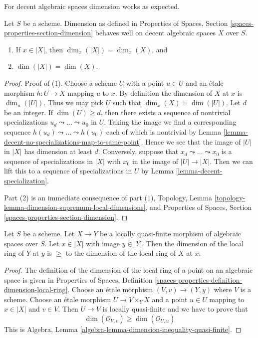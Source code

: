 \noindent
For decent algebraic spaces dimension works as expected.

\begin{lemma}
\label{lemma-dimension-decent-space}
Let $S$ be a scheme. Dimension as defined in
Properties of Spaces, Section \ref{spaces-properties-section-dimension}
behaves well on decent algebraic spaces $X$ over $S$.
\begin{enumerate}
\item If $x \in |X|$, then $\dim_x(|X|) = \dim_x(X)$, and
\item $\dim(|X|) = \dim(X)$.
\end{enumerate}
\end{lemma}

\begin{proof}
Proof of (1). Choose a scheme $U$ with a point $u \in U$
and an \'etale morphism $h : U \to X$ mapping $u$ to $x$.
By definition the dimension of $X$ at $x$ is $\dim_u(|U|)$.
Thus we may pick $U$ such that $\dim_x(X) = \dim(|U|)$.
Let $d$ be an integer. If $\dim(U) \geq d$, then
there exists a sequence of nontrivial specializations
$u_d \leadsto \ldots \leadsto u_0$ in $U$. Taking the image
we find a corresponding sequence
$h(u_d) \leadsto \ldots \leadsto h(u_0)$
each of which is nontrivial by
Lemma \ref{lemma-decent-no-specializations-map-to-same-point}.
Hence we see that the image of $|U|$ in $|X|$ has dimension at least $d$.
Conversely, suppose that $x_d \leadsto \ldots \leadsto x_0$ is a
sequence of specializations in $|X|$ with $x_0$ in the image of
$|U| \to |X|$. Then we can lift this to a sequence of specializations
in $U$ by Lemma \ref{lemma-decent-specialization}.

\medskip\noindent
Part (2) is an immediate consequence of part (1),
Topology, Lemma \ref{topology-lemma-dimension-supremum-local-dimensions},
and Properties of Spaces, Section \ref{spaces-properties-section-dimension}.
\end{proof}

\begin{lemma}
\label{lemma-dimension-local-ring-quasi-finite}
Let $S$ be a scheme. Let $X \to Y$ be a locally quasi-finite morphism
of algebraic spaces over $S$. Let $x \in |X|$ with image $y \in |Y|$.
Then the dimension of the local ring of $Y$ at $y$ is $\geq$ to the
dimension of the local ring of $X$ at $x$.
\end{lemma}

\begin{proof}
The definition of the dimension of the local ring of a point on an
algebraic space is given in Properties of Spaces, Definition
\ref{spaces-properties-definition-dimension-local-ring}.
Choose an \'etale morphism $(V, v) \to (Y, y)$ where $V$ is a scheme.
Choose an \'etale morphism $U \to V \times_Y X$ and a point $u \in U$
mapping to $x \in |X|$ and $v \in V$. Then $U \to V$ is locally
quasi-finite and we have to prove that
$$
\dim(\mathcal{O}_{V, v}) \geq \dim(\mathcal{O}_{U, u})
$$
This is Algebra, Lemma \ref{algebra-lemma-dimension-inequality-quasi-finite}.
\end{proof}

